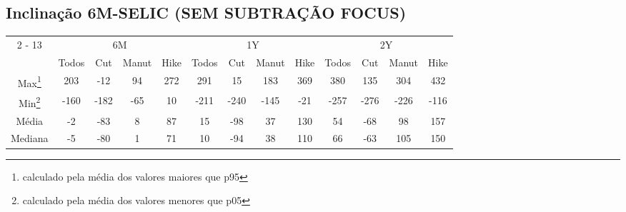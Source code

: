 \documentclass{article}%
\begin{document}
%
\subsection{Inclinação 6M{-}SELIC (SEM SUBTRAÇÃO FOCUS)}%
\label{subsec:Inclinao6M{-}SELIC(SEMSUBTRAOFOCUS)}%
\begin{minipage}{\textwidth}%
\vspace*{0.4in}%
\centering%
\hspace*{-0.3in}%
%
%
\begin{tabular}{c c c c c c c c c c c c c }%
\cline{2%
-%
13}%
&\multicolumn{4}{|c|}{6M}&\multicolumn{4}{c|}{1Y}&\multicolumn{4}{c|}{2Y}\\%
&\multicolumn{1}{|c}{Todos}&\multicolumn{1}{c}{Cut}&\multicolumn{1}{c}{Manut}&\multicolumn{1}{c|}{Hike}&\multicolumn{1}{c}{Todos}&\multicolumn{1}{c}{Cut}&\multicolumn{1}{c}{Manut}&\multicolumn{1}{c|}{Hike}&\multicolumn{1}{c}{Todos}&\multicolumn{1}{c}{Cut}&\multicolumn{1}{c}{Manut}&\multicolumn{1}{c|}{Hike}\\%
\hline%
\multicolumn{1}{|c|}{Max\footnote{calculado pela média dos valores maiores que p95}}&\multicolumn{1}{c}{203}&\multicolumn{1}{c}{{-}12}&\multicolumn{1}{c}{94}&\multicolumn{1}{c|}{272}&\multicolumn{1}{c}{291}&\multicolumn{1}{c}{15}&\multicolumn{1}{c}{183}&\multicolumn{1}{c|}{369}&\multicolumn{1}{c}{380}&\multicolumn{1}{c}{135}&\multicolumn{1}{c}{304}&\multicolumn{1}{c|}{432}\\%
\hline%
\multicolumn{1}{|c|}{Min\footnote{calculado pela média dos valores menores que p05}}&\multicolumn{1}{c}{{-}160}&\multicolumn{1}{c}{{-}182}&\multicolumn{1}{c}{{-}65}&\multicolumn{1}{c|}{10}&\multicolumn{1}{c}{{-}211}&\multicolumn{1}{c}{{-}240}&\multicolumn{1}{c}{{-}145}&\multicolumn{1}{c|}{{-}21}&\multicolumn{1}{c}{{-}257}&\multicolumn{1}{c}{{-}276}&\multicolumn{1}{c}{{-}226}&\multicolumn{1}{c|}{{-}116}\\%
\hline%
\multicolumn{1}{|c|}{Média}&\multicolumn{1}{c}{{-}2}&\multicolumn{1}{c}{{-}83}&\multicolumn{1}{c}{8}&\multicolumn{1}{c|}{87}&\multicolumn{1}{c}{15}&\multicolumn{1}{c}{{-}98}&\multicolumn{1}{c}{37}&\multicolumn{1}{c|}{130}&\multicolumn{1}{c}{54}&\multicolumn{1}{c}{{-}68}&\multicolumn{1}{c}{98}&\multicolumn{1}{c|}{157}\\%
\hline%
\multicolumn{1}{|c|}{Mediana}&\multicolumn{1}{c}{{-}5}&\multicolumn{1}{c}{{-}80}&\multicolumn{1}{c}{1}&\multicolumn{1}{c|}{71}&\multicolumn{1}{c}{10}&\multicolumn{1}{c}{{-}94}&\multicolumn{1}{c}{38}&\multicolumn{1}{c|}{110}&\multicolumn{1}{c}{66}&\multicolumn{1}{c}{{-}63}&\multicolumn{1}{c}{105}&\multicolumn{1}{c|}{150}\\%

\end{tabular}
\end{minipage}
\end{document}
